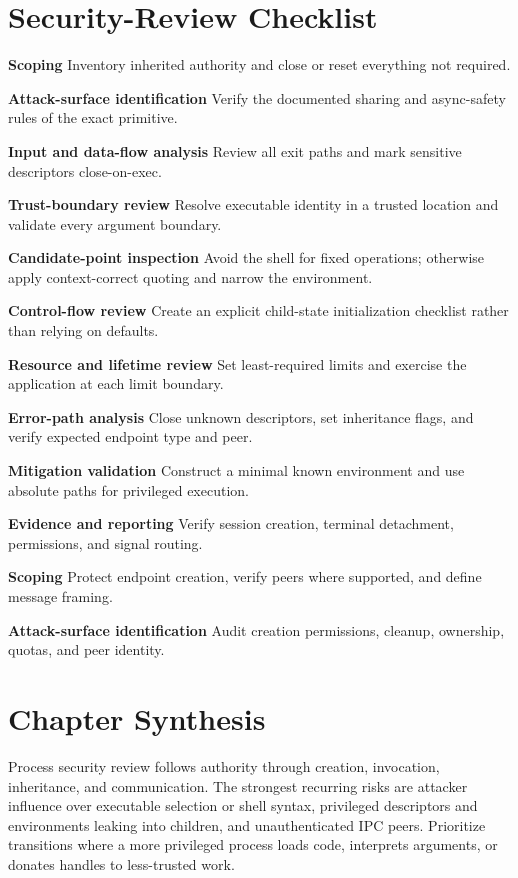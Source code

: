 \documentclass[11pt,letterpaper]{article}
\begin{document}
\section{Security-Review Checklist}
\begin{CornellChecklist}
\item \textbf{Scoping}
Inventory inherited authority and close or reset everything not required.
\item \textbf{Attack-surface identification}
Verify the documented sharing and async-safety rules of the exact primitive.
\item \textbf{Input and data-flow analysis}
Review all exit paths and mark sensitive descriptors close-on-exec.
\item \textbf{Trust-boundary review}
Resolve executable identity in a trusted location and validate every argument boundary.
\item \textbf{Candidate-point inspection}
Avoid the shell for fixed operations; otherwise apply context-correct quoting and narrow the environment.
\item \textbf{Control-flow review}
Create an explicit child-state initialization checklist rather than relying on defaults.
\item \textbf{Resource and lifetime review}
Set least-required limits and exercise the application at each limit boundary.
\item \textbf{Error-path analysis}
Close unknown descriptors, set inheritance flags, and verify expected endpoint type and peer.
\item \textbf{Mitigation validation}
Construct a minimal known environment and use absolute paths for privileged execution.
\item \textbf{Evidence and reporting}
Verify session creation, terminal detachment, permissions, and signal routing.
\item \textbf{Scoping}
Protect endpoint creation, verify peers where supported, and define message framing.
\item \textbf{Attack-surface identification}
Audit creation permissions, cleanup, ownership, quotas, and peer identity.
\end{CornellChecklist}
\section{Chapter Synthesis}
Process security review follows authority through creation, invocation, inheritance, and communication. The strongest recurring risks are attacker influence over executable selection or shell syntax, privileged descriptors and environments leaking into children, and unauthenticated IPC peers. Prioritize transitions where a more privileged process loads code, interprets arguments, or donates handles to less-trusted work.
\end{document}
